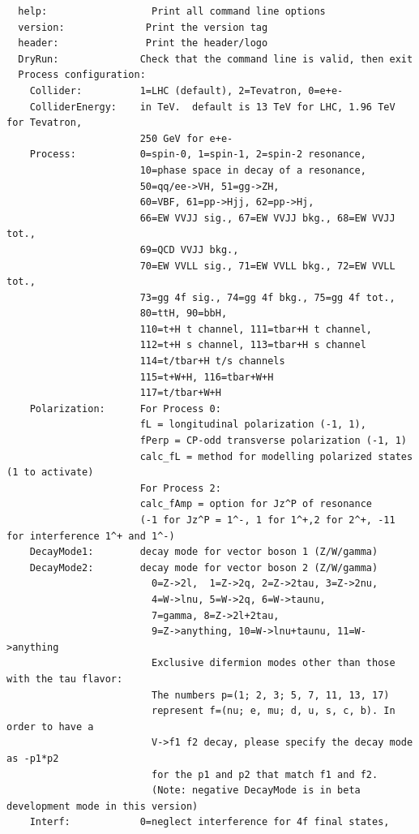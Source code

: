\documentclass[aps,superscriptaddress,nofootinbib]{revtex4}
\begin{document}
\begin{verbatim}
  help:                  Print all command line options
  version:              Print the version tag
  header:               Print the header/logo
  DryRun:              Check that the command line is valid, then exit
  Process configuration:
    Collider:          1=LHC (default), 2=Tevatron, 0=e+e-
    ColliderEnergy:    in TeV.  default is 13 TeV for LHC, 1.96 TeV for Tevatron,
                       250 GeV for e+e-
    Process:           0=spin-0, 1=spin-1, 2=spin-2 resonance,
                       10=phase space in decay of a resonance,
                       50=qq/ee->VH, 51=gg->ZH,
                       60=VBF, 61=pp->Hjj, 62=pp->Hj,
                       66=EW VVJJ sig., 67=EW VVJJ bkg., 68=EW VVJJ tot.,
                       69=QCD VVJJ bkg.,
                       70=EW VVLL sig., 71=EW VVLL bkg., 72=EW VVLL tot.,
                       73=gg 4f sig., 74=gg 4f bkg., 75=gg 4f tot.,
                       80=ttH, 90=bbH,
                       110=t+H t channel, 111=tbar+H t channel,
                       112=t+H s channel, 113=tbar+H s channel
                       114=t/tbar+H t/s channels
                       115=t+W+H, 116=tbar+W+H
                       117=t/tbar+W+H
    Polarization:      For Process 0:
                       fL = longitudinal polarization (-1, 1),
                       fPerp = CP-odd transverse polarization (-1, 1) 
                       calc_fL = method for modelling polarized states (1 to activate)
                       For Process 2:
                       calc_fAmp = option for Jz^P of resonance 
                       (-1 for Jz^P = 1^-, 1 for 1^+,2 for 2^+, -11 for interference 1^+ and 1^-)
    DecayMode1:        decay mode for vector boson 1 (Z/W/gamma)
    DecayMode2:        decay mode for vector boson 2 (Z/W/gamma)
                         0=Z->2l,  1=Z->2q, 2=Z->2tau, 3=Z->2nu,
                         4=W->lnu, 5=W->2q, 6=W->taunu,
                         7=gamma, 8=Z->2l+2tau,
                         9=Z->anything, 10=W->lnu+taunu, 11=W->anything
                         Exclusive difermion modes other than those with the tau flavor:
                         The numbers p=(1; 2, 3; 5, 7, 11, 13, 17)
                         represent f=(nu; e, mu; d, u, s, c, b). In order to have a
                         V->f1 f2 decay, please specify the decay mode as -p1*p2
                         for the p1 and p2 that match f1 and f2.
                         (Note: negative DecayMode is in beta development mode in this version)
    Interf:            0=neglect interference for 4f final states,

\end{verbatim}
\end{document}
